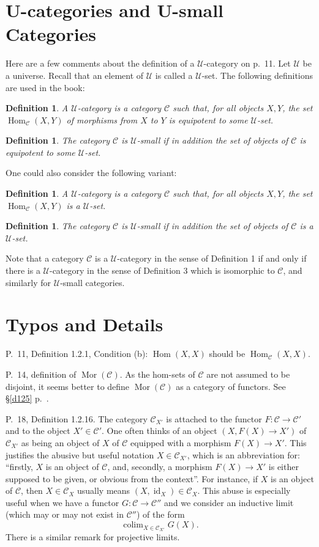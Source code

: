 \documentclass[12pt]{article}
\newtheorem{df}[thm]{Definition}%
\theoremstyle{remark}
\theoremstyle{definition}
\newcommand{\C}{\mathcal C}
\newcommand{\U}{\mathcal U}
\DeclareMathOperator*{\coli}{colim}
\DeclareMathOperator{\id}{id}
\DeclareMathOperator{\Hom}{Hom}%
\DeclareMathOperator{\Mor}{Mor}
\begin{document}
\section{U-categories and U-small Categories}\label{ucat}
%
Here are a few comments about the definition of a $\U$-category on p.~11. Let $\U$ be a universe. Recall that an element of $\U$ is called a $\U$-set. The following definitions are used in the book: 
%
\begin{df} 
A $\U$-category is a category $\C$ such that, for all objects $X,Y$, the set $\Hom_\C(X,Y)$ of morphisms from $X$ to $Y$ is equipotent to some $\U$-set. 
\end{df} 
%
\begin{df}
The category $\C$ is $\U$-small if in addition the set of objects of $\C$ is equipotent to some $\U$-set. 
\end{df} 
%
One could also consider the following variant: 
%
\begin{df}\label{ducat}
A $\U$-category is a category $\C$ such that, for all objects $X,Y$, the set $\Hom_\C(X,Y)$ is a $\U$-set. 
\end{df} 
%
\begin{df}\label{small}
The category $\C$ is $\U$-small if in addition the set of objects of $\C$ is a $\U$-set. 
\end{df} 
%
Note that a category $\C$ is a $\U$-category in the sense of Definition 1 if and only if there is a $\U$-category in the sense of Definition 3 which is isomorphic to $\C$, and similarly for $\U$-small categories.%
%
\begin{center}
\end{center}
%
\section{Typos and Details} %
%
P.~11, Definition 1.2.1, Condition (b): $\Hom(X,X)$ should be $\Hom_{\C}(X,X)$. 

\noindent P.~14, definition of $\Mor(\C)$. As the hom-sets of $\C$ are not assumed to be disjoint, it seems better to define $\Mor(\C)$ as a category of functors. See \S\ref{d125} p.~\pageref{d125}.


\noindent P.~18, Definition 1.2.16. The category $\C_{X'}$ is attached to the functor $F:\C\to\C'$ and to the object $X'\in\C'$. One often thinks of an object $(X,F(X)\to X')$ of $\C_{X'}$ as being an object of $X$ of $\C$ equipped with a morphism $F(X)\to X'$. This justifies the abusive but useful notation $X\in\C_{X'}$, which is an abbreviation for: ``firstly, $X$ is an object of $\C$, and, secondly, a morphism $F(X)\to X'$ is either supposed to be given, or obvious from the context''. For instance, if $X$ is an object of $\C$, then $X\in\C_X$ usually means $(X,\id_X)\in\C_X$. This abuse is especially useful when we have a functor $G:\C\to\C''$ and we consider an inductive limit (which may or may not exist in $\C''$) of the form 
%
\begin{equation}\label{convnot}
\coli_{X\in\C_{X'}}G(X).
\end{equation}
%
There is a similar remark for projective limits. 
\end{document}
